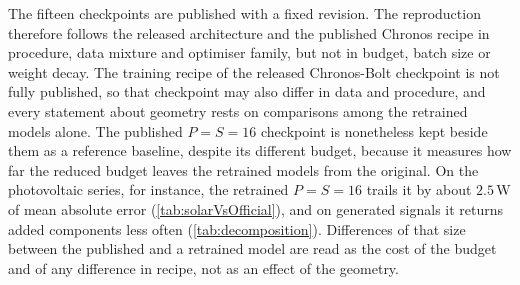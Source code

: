 The fifteen checkpoints are published with a fixed revision\autocite{sabbadiniChronosBoltPatchSweep2026}. The reproduction therefore follows the released architecture and the published Chronos recipe in procedure, data mixture and optimiser family, but not in budget, batch size or weight decay. The training recipe of the released Chronos-Bolt checkpoint is not fully published, so that checkpoint may also differ in data and procedure, and every statement about geometry rests on comparisons among the retrained models alone. The published $P=S=16$ checkpoint is nonetheless kept beside them as a reference baseline, despite its different budget, because it measures how far the reduced budget leaves the retrained models from the original. On the photovoltaic series, for instance, the retrained $P=S=16$ trails it by about $2.5$\,W of mean absolute error (\autoref{tab:solarVsOfficial}), and on generated signals it returns added components less often (\autoref{tab:decomposition}). Differences of that size between the published and a retrained model are read as the cost of the budget and of any difference in recipe, not as an effect of the geometry.
